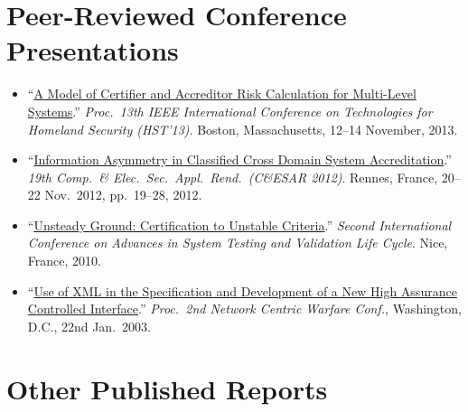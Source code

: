 \documentclass[12pt,twoside,letterpaper]{article}
\begin{document}
\vspace{-7mm}
\section*{Peer-Reviewed Conference Presentations}
\vspace{-2mm}

\begin{itemize}
	\item ``\href{http://ieeexplore.ieee.org/xpls/abs_all.jsp?arnumber=6699004}%
{A Model of Certifier and Accreditor Risk Calculation for Multi-Level
Systems}.'' \emph{Proc.\ 13th IEEE International Conference on Technologies
for Homeland Security (HST'13)}. Boston, Massachusetts, 12--14 November,
2013.\vspace{-1mm}

	\item
``\href{http://call-with-current-continuation.com/papers/CESAR2012_information_asymmetry.pdf}%
{Information Asymmetry in Classified Cross Domain System Accreditation}.''
\emph{19th Comp.\ \& Elec.\ Sec.\ Appl.\ Rend.\ (C\&ESAR 2012)}. Rennes,
France, 20--22 Nov.\ 2012, pp.\ 19--28, 2012.\vspace{-1mm}

	\item
``\href{http://ieeexplore.ieee.org/xpl/articleDetails.jsp?arnumber=5617171}%
{Unsteady Ground: Certification to Unstable Criteria}.'' \emph{Second
International Conference on Advances in System Testing and Validation Life
Cycle}. Nice, France, 2010.\vspace{-1mm}


	\item ``\href{http://call-with-current-continuation.com/papers/xml_paper.pdf}%
{Use of XML in the Specification and Development of a New High Assurance
Controlled Interface}.'' \emph{Proc.\ 2nd Network Centric Warfare Conf.},
Washington, D.C., 22nd Jan.\ 2003.
\end{itemize}

\vspace{-7mm}
\section*{Other Published Reports}
\vspace{-2mm}
\end{document}

